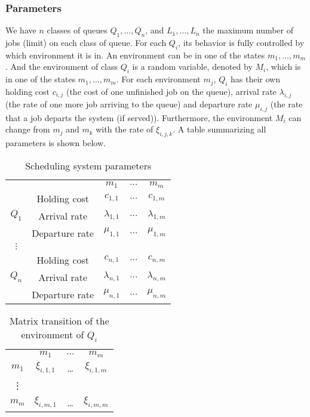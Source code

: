 \documentclass[
  a4paper, xcolor = usenames,dvipsnames]{article}
\theoremstyle{definition}
\theoremstyle{definition}
\theoremstyle{definition}
\theoremstyle{definition}
\theoremstyle{remark}
\begin{document}
\hypertarget{parameters}{%
\subsubsection{Parameters}\label{parameters}}

We have \(n\) classes of queues \(Q_{1}, \dots, Q_{n}\), and \(L_{1}, \dots, L_{n}\) the maximum number of jobs (limit) on each class of queue. For each \(Q_{i}\), its behavior is fully controlled by which environment it is in. An environment can be in one of the states \(m_{1}, \dots, m_{m}\). And the environment of class \(Q_{i}\) is a random variable, denoted by \(M_{i}\), which is in one of the states \(m_{1}, \dots, m_{m}\). For each environment \(m_{j}\), \(Q_{i}\) has their own holding cost \(c_{i, j}\) (the cost of one unfinished job on the queue), arrival rate \(\lambda_{i, j}\) (the rate of one more job arriving to the queue) and departure rate \(\mu_{i, j}\) (the rate that a job departs the system (if served)). Furthermore, the environment \(M_{i}\) can change from \(m_{j}\) and \(m_{k}\) with the rate of \(\xi_{i, j, k}\). A table summarizing all parameters is shown below.

\begin{table}[!htbp]
\caption{Scheduling system parameters}
\begin{center}
\begin{tabular}{c c c c c}
    \hline
    \multicolumn{2}{c}{} & $m_{1}$ & $\dots$ & $m_{m}$ \\
    \cline{2-5}
    \multirow{3}{*}{$Q_{1}$} &  Holding cost & $c_{1, 1}$ & $\dots$ & $c_{1, m}$ \\
    & Arrival rate & $\lambda_{1, 1}$ & $\dots$ & $\lambda_{1, m}$ \\
    & Departure rate & $\mu_{1, 1}$ & $\dots$ & $\mu_{1, m}$ \\
    \cline{2-5}
    $\vdots$  \\
    \cline{2-5}
    \multirow{3}{*}{$Q_{n}$} &  Holding cost & $c_{n, 1}$ & $\dots$ & $c_{n, m}$ \\
    & Arrival rate & $\lambda_{n, 1}$ & $\dots$ & $\lambda_{n, m}$ \\
    & Departure rate & $\mu_{n, 1}$ & $\dots$ & $\mu_{n, m}$ \\
    \hline
\end{tabular}
\end{center}
\label{tab:qs-param}
\end{table}

\begin{table}[!htbp]
\caption{Matrix transition of the environment of $Q_{i}$}
\begin{center}
\begin{tabular}{c c c c}
    \hline
    & $m_{1}$ & $\dots$ & $m_{m}$ \\
    $m_{1}$ & $\xi_{i, 1, 1}$ & \dots & $\xi_{i, 1, m}$ \\
    \vdots \\
    $m_{m}$ & $\xi_{i, m, 1}$ & \dots & $\xi_{i, m, m}$ \\
    \hline
\end{tabular}
\end{center}
\label{tab:mat-transition-ci}
\end{table}
\end{document}
